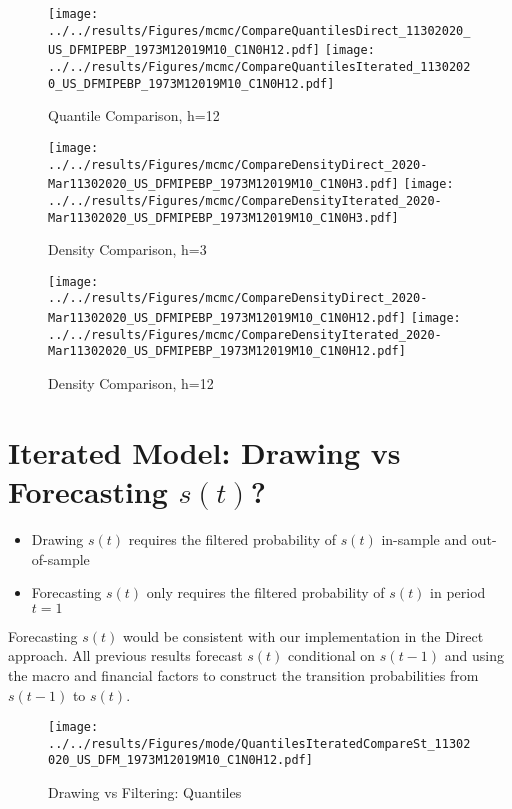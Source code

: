 \documentclass[12pt]{article}
\numberwithin{table}{subsection}
\numberwithin{figure}{section}
\begin{document}
\begin{figure}[htb!]
	\caption{Quantile Comparison, h=12}
	\centering
	\texttt{[image: ../../results/Figures/mcmc/CompareQuantilesDirect\_11302020\_US\_DFMIPEBP\_1973M12019M10\_C1N0H12.pdf]}
	\texttt{[image: ../../results/Figures/mcmc/CompareQuantilesIterated\_11302020\_US\_DFMIPEBP\_1973M12019M10\_C1N0H12.pdf]}
\end{figure}



\begin{figure}[htb!]
	\caption{Density Comparison, h=3}
	\centering
	\texttt{[image: ../../results/Figures/mcmc/CompareDensityDirect\_2020-Mar11302020\_US\_DFMIPEBP\_1973M12019M10\_C1N0H3.pdf]}
	\texttt{[image: ../../results/Figures/mcmc/CompareDensityIterated\_2020-Mar11302020\_US\_DFMIPEBP\_1973M12019M10\_C1N0H3.pdf]}
\end{figure}

\begin{figure}[htb!]
	\caption{Density Comparison, h=12}
	\centering
	\texttt{[image: ../../results/Figures/mcmc/CompareDensityDirect\_2020-Mar11302020\_US\_DFMIPEBP\_1973M12019M10\_C1N0H12.pdf]}
	\texttt{[image: ../../results/Figures/mcmc/CompareDensityIterated\_2020-Mar11302020\_US\_DFMIPEBP\_1973M12019M10\_C1N0H12.pdf]}
\end{figure}


\clearpage
\section{Iterated Model: Drawing vs Forecasting $s(t)$? }
\begin{itemize}
	\item Drawing $s(t)$ requires the filtered probability of $s(t)$ in-sample and out-of-sample 
	\item Forecasting $s(t)$ only requires the filtered probability of $s(t)$ in period $t=1$
\end{itemize}

Forecasting $s(t)$ would be consistent with our implementation in the Direct approach. All previous results forecast $s(t)$ conditional on $s(t-1)$ and using the macro and financial factors 
to construct the transition probabilities from $s(t-1)$ to $s(t)$.

\begin{figure}[h!]
	\caption{Drawing vs Filtering: Quantiles}
	\centering
	\texttt{[image: ../../results/Figures/mode/QuantilesIteratedCompareSt\_11302020\_US\_DFM\_1973M12019M10\_C1N0H12.pdf]}	
\end{figure}
\end{document}
